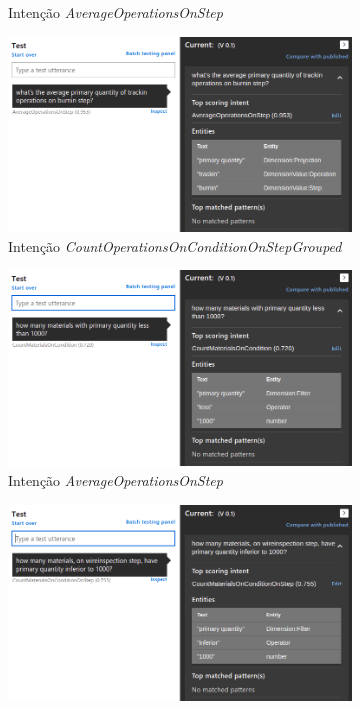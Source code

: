 \begin{figure}[!ht]
\begin{subfigure}{.48\textwidth}
        \caption{Intenção \textit{AverageOperationsOnStep}}
     \end{subfigure}
     \begin{subfigure}{.48\textwidth}
        \centering
        \includegraphics[width=\textwidth]{appendices/assets/nlcomprehension04.png}
        \caption{Intenção \textit{CountOperationsOnConditionOnStepGrouped}}
     \end{subfigure}
     \bigbreak
     \begin{subfigure}{.48\textwidth}
        \centering
        \includegraphics[width=\textwidth]{appendices/assets/nlcomprehension05.png}
        \caption{Intenção \textit{AverageOperationsOnStep}}
     \end{subfigure}
     \begin{subfigure}{.48\textwidth}
        \centering
        \includegraphics[width=\textwidth]{appendices/assets/nlcomprehension06.png}

\end{subfigure}
\end{figure}
